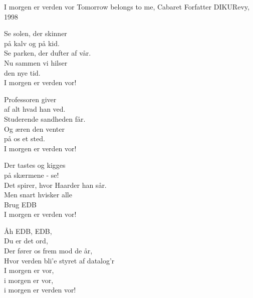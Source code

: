 \begin{song}{I morgen er verden vor}
  {} %
  {Tomorrow belongs to me, Cabaret} %
  {Forfatter} %
  {DIKURevy, 1998} %
  {\NotCCLIed} %

  \begin{SBVerse}
    Se solen, der skinner\\
    på kalv og på kid.\\
    Se parken, der dufter af vår.\\
    Nu sammen vi hilser\\
    den nye tid.\\
    I morgen er verden vor!
  \end{SBVerse}

  \begin{SBVerse}
    Professoren giver\\
    af alt hvad han ved.\\
    Studerende sandheden får.\\
    Og æren den venter\\
    på os et sted.\\
    I morgen er verden vor!
  \end{SBVerse}

  \begin{SBVerse}
    Der tastes og kigges\\
    på skærmene - se!\\
    Det spirer, hvor Haarder han sår.\\
    Men snart hvisker alle\\
    Brug EDB\\
    I morgen er verden vor!
  \end{SBVerse}

  \begin{SBVerse}
    Åh EDB, EDB,\\
    Du er det ord,\\
    Der fører os frem mod de år,\\
    Hvor verden bli'e styret af datalog'r\\
    I morgen er vor,\\
    i morgen er vor,\\
    i morgen er verden vor!
  \end{SBVerse}
\end{song}